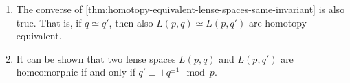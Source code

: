 \begin{remark}
  \begin{enumerate}[1.]
    \item 
      The converse of
      \autoref{thm:homotopy-equivalent-lense-spaces-same-invariant}
      is also true.
      That is, if $q \simeq q'$,
      then also  $L(p,q) \simeq L(p,q')$  are homotopy equivalent.
    \item
      It can be shown that two lense spaces $L(p,q)$ and  $L(p,q')$
      are homeomorphic if and only if  $q' \equiv \pm q^{\pm 1} \mod p$.
  \end{enumerate}
\end{remark}
